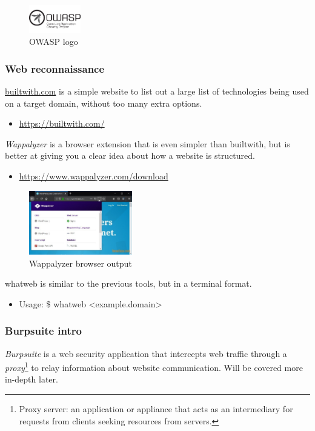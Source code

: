 \documentclass[a4paper,11pt]{article}
\renewcommand{\tt}[2][tt]{\textcolor{#1}{\ttfamily #2}}%
\begin{document}
\begin{figure}[h]
    \vspace{-0.6cm}
    \centering
    \includegraphics[width=0.2\textwidth]{images/owasp.png}
    \caption{\small{OWASP logo}}
    \label{fig:owasp}
\end{figure}
\pagebreak

\subsubsection{Web reconnaissance}
\label{sub2sec:webrecon}

\url{builtwith.com} is a simple website to list out a large list of technologies being used on a target domain, without too many extra options.
\begin{itemize}
    \item \url{https://builtwith.com/}
\end{itemize}
\textit{Wappalyzer} is a browser extension that is even simpler than builtwith, but is better at giving you a clear idea about how a website is structured.
\begin{itemize}
    \item \url{https://www.wappalyzer.com/download}
\end{itemize}

\begin{figure}[h]
    \centering
    \includegraphics[width=0.4\textwidth]{images/wapp.jpg}
    \caption{Wappalyzer browser output}
    \label{fig:wapp}
\end{figure}

\tt{whatweb} is similar to the previous tools, but in a terminal format.
\begin{itemize}
    \item Usage: \tt{\$ whatweb <example.domain>}
\end{itemize}

\subsubsection{Burpsuite intro}
\textit{Burpsuite} is a web security application that intercepts web traffic through a \textit{proxy}\footnote[2]{Proxy server: an application or appliance that acts as an intermediary for requests from clients seeking resources from servers.} to relay information about website communication. Will be covered more in-depth later.
\end{document}
